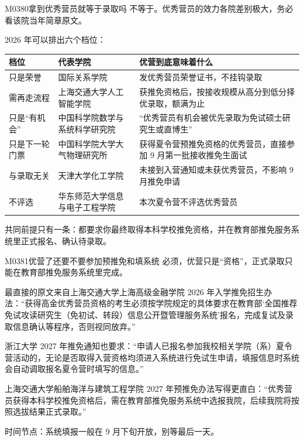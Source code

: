 \begin{qa}{M0380}{拿到优秀营员就等于录取吗}
不等于。优秀营员的效力各院差别极大，务必看该院当年简章原文。

2026 年可以排出六个档位：
\par\vspace{2pt}\nobreak\begin{center}\footnotesize
\begin{tabularx}{\textwidth}{>{\raggedright\arraybackslash}X>{\raggedright\arraybackslash}X>{\raggedright\arraybackslash}X}
\toprule
\textbf{档位} & \textbf{代表学院} & \textbf{优营到底意味着什么} \\ \midrule
只是荣誉 & 国际关系学院 & 发优秀营员荣誉证书，不挂钩录取 \\
需再走流程 & 上海交通大学人工智能学院 & 获推免资格后，按接收规模从高分到低分择优录取，额满为止 \\
只是“有机会” & 中国科学院数学与系统科学研究院 & “优秀营员有机会被优先录取为免试硕士研究生或直博生” \\
只是下一轮门票 & 中国科学院大学大气物理研究所 & 获得夏令营预推免资格的优秀营员，直接参加 9 月第一批接收推免生面试 \\
与录取无关 & 天津大学化工学院 & 未接到入营通知或未获优秀营员，不影响 9 月推免申请 \\
不评选 & 华东师范大学信息与电子工程学院 & 本次夏令营不评选优秀营员 \\
\bottomrule
\end{tabularx}
\end{center}\vspace{2pt}\par

共同前提只有一条：都要求你最终取得本科学校推免资格，并在教育部推免服务系统里正式报名、确认待录取。
\end{qa}

\begin{qa}{M0381}{优营了还要不要参加预推免和填系统}
必须，优营只是“资格”，正式录取只能在教育部推免服务系统里完成。

最直接的原文来自上海交通大学上海高级金融学院 2026 年入学推免招生办法：“获得高金优秀营员资格的考生必须按学院规定的具体要求在教育部‘全国推荐免试攻读研究生（免初试、转段）信息公开暨管理服务系统’报名，完成复试及录取信息确认等程序，否则视同放弃。”

浙江大学 2027 年推免通知也要求：“申请人已报名参加我校相关学院（系）夏令营活动的，无论是否取得入营资格均须进入系统进行免试生申请，填报信息时系统会自动调取报名夏令营时填写的信息。”

上海交通大学船舶海洋与建筑工程学院 2027 年预推免办法写得更直白：“优秀营员获得本科学校推免资格后，需在教育部推免服务系统中选报我院，后续我院将按照选拔结果正式录取。”

时间节点：系统填报一般在 9 月下旬开放，别等最后一天。
\end{qa}

